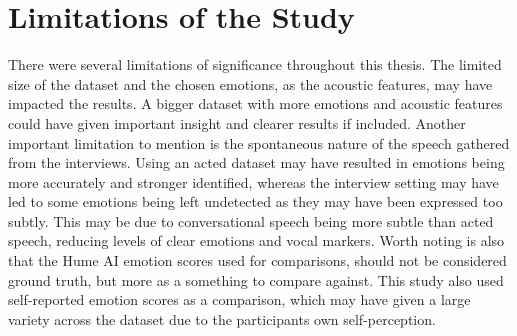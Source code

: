 \section{Limitations of the Study}
\label{sec:con-limitations}
There were several limitations of significance throughout this thesis. The limited size of the dataset and the chosen emotions, as the acoustic features, may have impacted the results. A bigger dataset with more emotions and acoustic features could have given important insight and clearer results if included.
Another important limitation to mention is the spontaneous nature of the speech gathered from the interviews. Using an acted dataset may have resulted in emotions being more accurately and stronger identified, whereas the interview setting may have led to some emotions being left undetected as they may have been expressed too subtly. This may be due to conversational speech being more subtle than acted speech, reducing levels of clear emotions and vocal markers.
Worth noting is also that the Hume AI emotion scores used for comparisons, should not be considered ground truth, but more as a something to compare against.  
This study also used self-reported emotion scores as a comparison, which may have given a large variety across the dataset due to the participants own self-perception.
